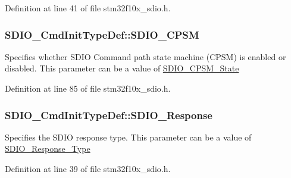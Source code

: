 Definition at line 41 of file stm32f10x\+\_\+sdio.\+h.

\subsubsection[{\texorpdfstring{S\+D\+I\+O\+\_\+\+C\+P\+SM}{SDIO_CPSM}}]{ S\+D\+I\+O\+\_\+\+Cmd\+Init\+Type\+Def\+::\+S\+D\+I\+O\+\_\+\+C\+P\+SM}\hypertarget{struct_s_d_i_o___cmd_init_type_def_ab0e869ae285cc132478dd743c28cd8e2}{}\label{struct_s_d_i_o___cmd_init_type_def_ab0e869ae285cc132478dd743c28cd8e2}
Specifies whether S\+D\+IO Command path state machine (C\+P\+SM) is enabled or disabled. This parameter can be a value of \hyperlink{group___s_d_i_o___c_p_s_m___state}{S\+D\+I\+O\+\_\+\+C\+P\+S\+M\+\_\+\+State} 

Definition at line 85 of file stm32f10x\+\_\+sdio.\+h.

\subsubsection[{\texorpdfstring{S\+D\+I\+O\+\_\+\+Response}{SDIO_Response}}]{ S\+D\+I\+O\+\_\+\+Cmd\+Init\+Type\+Def\+::\+S\+D\+I\+O\+\_\+\+Response}\hypertarget{struct_s_d_i_o___cmd_init_type_def_a550e0368580051feec9d7599063cdd5a}{}\label{struct_s_d_i_o___cmd_init_type_def_a550e0368580051feec9d7599063cdd5a}
Specifies the S\+D\+IO response type. This parameter can be a value of \hyperlink{group___s_d_i_o___response___type}{S\+D\+I\+O\+\_\+\+Response\+\_\+\+Type} 

Definition at line 39 of file stm32f10x\+\_\+sdio.\+h.

